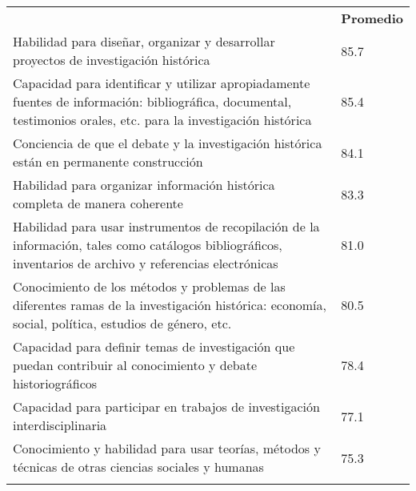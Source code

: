 \bigskip
\begin{center}
\begin{footnotesize}
\begin{supertabular}{|m{0.79\textwidth}|m{0.172\textwidth}|}
\hline
{}\\\hline
{} &
{\centering \bfseries Promedio}\\\hline
Habilidad para diseñar, organizar y desarrollar proyectos de investigación
histórica &
{\hfil 85.7}\\\hline
Capacidad para identificar y utilizar apropiadamente fuentes de información:
bibliográfica, documental, testimonios orales, etc\@. para la investigación
histórica &
{\hfil 85.4}\\\hline
Conciencia de que el debate y la investigación histórica están en permanente
construcción &
{\hfil 84.1}\\\hline
Habilidad para organizar información histórica completa de manera coherente
&
{\hfil 83.3}\\\hline
Habilidad para usar instrumentos de recopilación de la información, tales
como catálogos bibliográficos, inventarios de archivo y referencias
electrónicas &
{\hfil 81.0}\\\hline
Conocimiento de los métodos y problemas de las diferentes ramas de la
investigación histórica: economía, social, política, estudios de género,
etc. &
{\hfil 80.5}\\\hline
Capacidad para definir temas de investigación que puedan contribuir al
conocimiento y debate historiográficos &
{\hfil 78.4}\\\hline
Capacidad para participar en trabajos de investigación interdisciplinaria &
{\hfil 77.1}\\\hline
Conocimiento y habilidad para usar teorías, métodos y técnicas de otras
ciencias sociales y humanas &
{\hfil 75.3}\\\hline
{}\\\hline
\end{supertabular}
\end{footnotesize}
\end{center}

